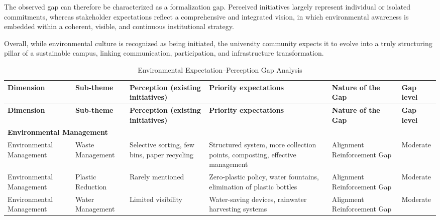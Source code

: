 \documentclass[12pt,a4paper]{article}
\begin{document}
The observed gap can therefore be characterized as a formalization gap. Perceived initiatives largely represent individual or isolated commitments, whereas stakeholder expectations reflect a comprehensive and integrated vision, in which environmental awareness is embedded within a coherent, visible, and continuous institutional strategy.

Overall, while environmental culture is recognized as being initiated, the university community expects it to evolve into a truly structuring pillar of a sustainable campus, linking communication, participation, and infrastructure transformation.

\begin{longtable}{p{2.8cm} p{2.5cm} p{3.3cm} p{3.3cm} p{2.5cm} p{1.2cm}}

\caption{Environmental Expectation--Perception Gap Analysis} \\

\toprule
\textbf{Dimension} & \textbf{Sub-theme} &
\textbf{Perception (existing initiatives)} &
\textbf{Priority expectations} &
\textbf{Nature of the Gap} &
\textbf{Gap level} \\
\midrule
\endfirsthead

\toprule
\textbf{Dimension} & \textbf{Sub-theme} &
\textbf{Perception (existing initiatives)} &
\textbf{Priority expectations} &
\textbf{Nature of the Gap} &
\textbf{Gap level} \\
\midrule
\endhead


\multicolumn{6}{l}{\textbf{Environmental Management}} \\
\midrule

Environmental Management
& Waste Management
& Selective sorting, few bins, paper recycling
& Structured system, more collection points, composting, effective management
& Alignment Reinforcement Gap
& Moderate \\

Environmental Management
& Plastic Reduction
& Rarely mentioned
& Zero-plastic policy, water fountains, elimination of plastic bottles
& Alignment Reinforcement Gap
& Moderate \\

Environmental Management
& Water Management
& Limited visibility
& Water-saving devices, rainwater harvesting systems
& Alignment Reinforcement Gap
& Moderate \\


\end{longtable}
\end{document}
